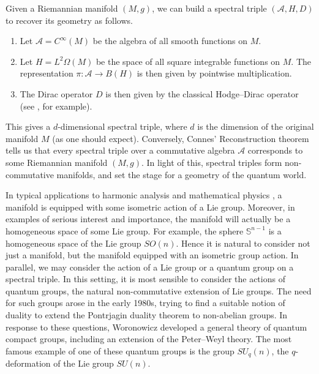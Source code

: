 \documentclass[12pt]{article}
\begin{document}
Given a Riemannian manifold $(M,g)$, we can build a spectral triple
$(\mathcal{A}, H, D)$ to recover its geometry as follows.
\begin{enumerate}
\item Let $\mathcal A=C^{\infty}(M)$ be the algebra of all smooth functions on $M$.
\item Let $H=L^2\Omega(M)$ be the space of all square integrable functions on $M.$ The representation $\pi:\mathcal A\to B(H)$ is then given by pointwise multiplication.
\item The Dirac operator $D$ is then given by the classical Hodge--Dirac operator (see \cite{BGV}, for example).
\end{enumerate}
This gives a $d$-dimensional spectral triple, where $d$ is the dimension of
the original manifold $M$ (as one should expect). Conversely, Connes' Reconstruction theorem \cite{Connes-reconstruction} tells us that every spectral triple over a commutative algebra $\mathcal A$ corresponds to some Riemannian manifold $(M,g).$ In light of this, spectral triples form non-commutative manifolds, and set the stage for a geometry of the quantum world.


In typical applications to harmonic analysis \cite{helgason} and mathematical physics \cite{c2dft}, a manifold is equipped with some isometric action of a Lie group. Moreover, in examples of serious interest and importance, the manifold will actually be a homogeneous space of some Lie group. For example, the sphere $\mathbb{S}^{n-1}$ is a homogeneous space of the Lie group $SO(n)$.
Hence it is natural to consider not just a manifold, but the manifold equipped
with an isometric group action.
In parallel, we may consider the action of a Lie group or a quantum group on
a spectral triple.
In this setting, it is most sensible to consider the actions of quantum groups,
the natural non-commutative extension of Lie groups.
The need for such groups arose in the early 1980s, trying to find a suitable
notion of duality to extend the Pontrjagin duality theorem to non-abelian groups.
In response to these questions, Woronowicz developed a general theory of
quantum compact groups, including an extension of the Peter--Weyl theory.
The most famous example of one of these quantum groups is the group
$SU_q(n)$, the $q$-deformation of the Lie group $SU(n)$.
\end{document}
